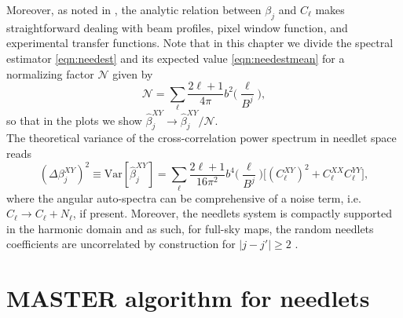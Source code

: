 Moreover, as noted in \cite{Pietrobon2006}, the analytic relation between $\beta_j$ and $C_{\ell}$ makes straightforward dealing 
with beam profiles, pixel window function, and experimental transfer functions. 
Note that in this chapter we divide the spectral estimator \eqref{eqn:needest} and its expected value \eqref{eqn:needestmean} for a normalizing
factor $\mathcal{N}$ given by 
%
\begin{equation}
\label{eqn:norm}
\mathcal{N} = \sum_{\ell} \frac{2\ell+1}{4\pi}  b^2\biggl( \frac{\ell}{B^j} \biggr),
\end{equation}
%
so that in the plots we show $\hat{\beta}^{XY}_{j} \to \hat{\beta}^{XY}_{j}/\mathcal{N}$.\\
The theoretical variance of the cross-correlation power spectrum in needlet space reads
%
\begin{equation}
\label{eqn:needestvar}
(\Delta\beta^{XY}_j)^2 \equiv \text{Var}[\hat{\beta}^{XY}_j]= \sum_{\ell} \frac{2\ell+1}{16\pi^2}  b^4 \biggl( \frac{\ell}{B^j} \biggr)
 \bigl[ (C_{\ell}^{XY})^2 + C_{\ell}^{XX}C_{\ell}^{YY} \bigr],
\end{equation}
%
where the angular auto-spectra can be comprehensive of a noise term, i.e. 
$C_{\ell} \to C_{\ell} + N_{\ell}$, if present. Moreover, the needlets system 
is compactly supported in the harmonic domain and as such, for full-sky maps, the random needlets coefficients are uncorrelated by 
construction for $|j-j'| \ge 2$ \citep{Baldi2009a}.


\section{MASTER algorithm for needlets}
\label{sec:master}

